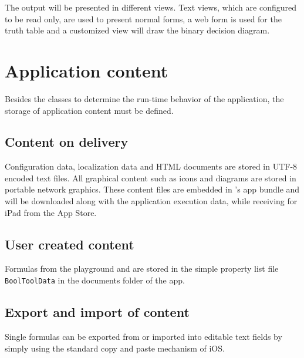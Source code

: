 The output will be presented in different views. Text views, which are configured to be read only, are used to present normal forms, 
a web form is used for the truth table and a customized view will draw the binary decision diagram.



\section{Application content}

Besides the classes to determine the run-time behavior of the application,
the storage of application content must be defined.

\subsection{Content on delivery}

Configuration data, localization data and HTML documents
are stored in UTF-8 encoded text files.
All graphical content such as icons and diagrams are stored in portable network graphics.
These content files are embedded in \Nyaya's app bundle
and will be downloaded along with the application execution data,
while receiving \Nyaya for iPad from the App Store.

\subsection{User created content}

Formulas from the playground and \BoolTool are stored 
in the simple property list file \verb+BoolToolData+ 
in the documents folder of the app.

\subsection{Export and import of content}

Single formulas can be exported from or imported into editable text fields 
by simply using the standard copy and paste mechanism of iOS.




